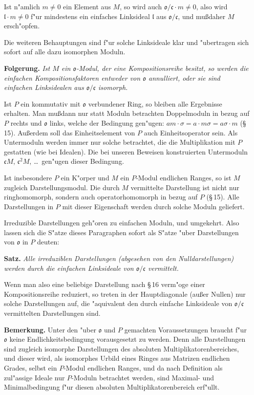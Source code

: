 \documentclass[12pt,a4paper]{article}
\theoremstyle{plain}
\begin{document}
Ist n"amlich $m \neq 0$ ein Element aus $M$, so wird auch $\mathfrak{o}/\mathfrak{c} \cdot m \neq 0$, also wird $\mathfrak{l} \cdot m \neq 0$ f"ur mindestens ein einfaches Linksideal $\mathfrak{l}$ aus $\mathfrak{o}/\mathfrak{c}$, und mu\ss daher $M$ ersch"opfen.

Die weiteren Behauptungen sind f"ur solche Linksideale klar und "ubertragen sich sofort auf alle dazu isomorphen Moduln.

\medskip\noindent\textbf{Folgerung.}
\textit{Ist $M$ ein $\mathfrak{o}$-Modul, der eine Kompositionsreihe besitzt, so werden die einfachen Kompositionsfaktoren entweder von $\mathfrak{o}$ annulliert, oder sie sind einfachen Linksidealen aus $\mathfrak{o}/\mathfrak{c}$ isomorph.}

Ist $P$ ein kommutativ mit $\mathfrak{o}$ verbundener Ring, so bleiben alle Ergebnisse erhalten. Man mu\ss dann nur statt Moduln betrachten Doppelmoduln in bezug auf $P$ rechts und $\mathfrak{o}$ links, welche der Bedingung gen"ugen: $am \cdot \sigma = a \cdot m\sigma = a\sigma \cdot m$ (\S\,15). Au\ss erdem soll das Einheitselement von $P$ auch Einheitsoperator sein. Als Untermoduln werden immer nur solche betrachtet, die die Multiplikation mit $P$ gestatten (wie bei Idealen). Die bei unseren Beweisen konstruierten Untermoduln $\mathfrak{c}M$, $\mathfrak{c}^2M$, \ldots\ gen"ugen dieser Bedingung.

Ist insbesondere $P$ ein K"orper und $M$ ein $P$-Modul endlichen Ranges, so ist $M$ zugleich Darstellungsmodul. Die durch $M$ vermittelte Darstellung ist nicht nur ringhomomorph, sondern auch operatorhomomorph in bezug auf $P$ (\S\,15). Alle Darstellungen in $P$ mit dieser Eigenschaft werden durch solche Moduln geliefert.

Irreduzible Darstellungen geh"oren zu einfachen Moduln, und umgekehrt. Also lassen sich die S"atze dieses Paragraphen sofort als S"atze "uber Darstellungen von $\mathfrak{o}$ in $P$ deuten:

\medskip\noindent\textbf{Satz.}
\textit{Alle irreduziblen Darstellungen (abgesehen von den Nulldarstellungen) werden durch die einfachen Linksideale von $\mathfrak{o}/\mathfrak{c}$ vermittelt.}

Wenn man also eine beliebige Darstellung nach \S\,16 verm"oge einer Kompositionsreihe reduziert, so treten in der Hauptdiagonale (au\ss er Nullen) nur solche Darstellungen auf, die "aquivalent den durch einfache Linksideale von $\mathfrak{o}/\mathfrak{c}$ vermittelten Darstellungen sind.

\medskip\noindent\textbf{Bemerkung.}
Unter den "uber $\mathfrak{o}$ und $P$ gemachten Voraussetzungen braucht f"ur $\mathfrak{o}$ keine Endlichkeitsbedingung vorausgesetzt zu werden. Denn alle Darstellungen sind zugleich isomorphe Darstellungen des absoluten Multiplikatorenbereiches, und dieser wird, als isomorphes Urbild eines Ringes aus Matrizen endlichen Grades, selbst ein $P$-Modul endlichen Ranges, und da nach Definition als zul"assige Ideale nur $P$-Moduln betrachtet werden, sind Maximal- und Minimalbedingung f"ur diesen absoluten Multiplikatorenbereich erf"ullt.
\end{document}
